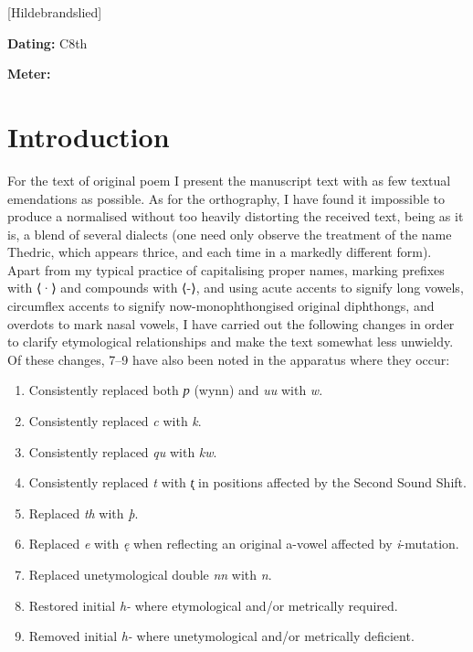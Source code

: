 [Hildebrandslied]
\def\thisBookCode{Hildebrandslied}

\begin{flushright}%
\textbf{Dating:} C8th

\textbf{Meter:} \Fornyrdislag%
\end{flushright}%

\section{Introduction}

For the text of original poem I present the manuscript text with as few textual emendations as possible. As for the orthography, I have found it impossible to produce a normalised without too heavily distorting the received text, being as it is, a blend of several dialects (one need only observe the treatment of the name Thedric, which appears thrice, and each time in a markedly different form). Apart from my typical practice of capitalising proper names, marking prefixes with ⟨·⟩ and compounds with ⟨-⟩, and using acute accents to signify long vowels, circumflex accents to signify now-monophthongised original diphthongs, and overdots to mark nasal vowels, I have carried out the following changes in order to clarify etymological relationships and make the text somewhat less unwieldy. Of these changes, 7–9 have also been noted in the apparatus where they occur:
\begin{enumerate}
  \item Consistently replaced both \emph{ƿ} (wynn) and \emph{uu} with \emph{w}.
  \item Consistently replaced \emph{c} with \emph{k}.
  \item Consistently replaced \emph{qu} with \emph{kw}.
  \item Consistently replaced \emph{t} with \emph{t̨} in positions affected by the Second Sound Shift.
  \item Replaced \emph{th} with \emph{þ}.
  \item Replaced \emph{e} with \emph{ę} when reflecting an original a-vowel affected by \emph{i}-mutation.
  \item Replaced unetymological double \emph{nn} with \emph{n}.
  \item Restored initial \emph{h-} where etymological and/or metrically required.
  \item Removed initial \emph{h-} where unetymological and/or metrically deficient.
\end{enumerate}


